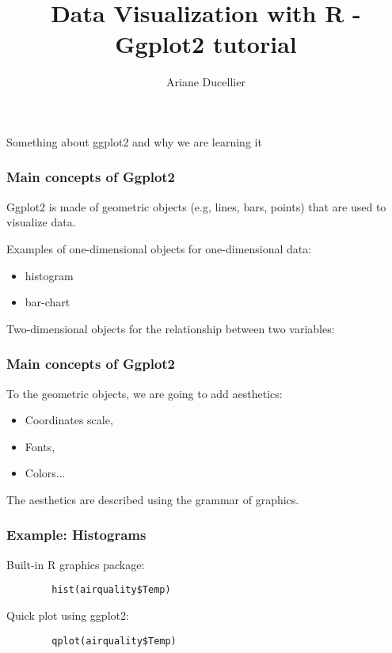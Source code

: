\documentclass{beamer}
\title[Ggplot2 tutorial]{Data Visualization with R - Ggplot2 tutorial}
\author{Ariane Ducellier}
\begin{document}
	\begin{frame}
		\titlepage
	\end{frame}

	\begin{frame}
		Something about ggplot2 and why we are learning it
	\end{frame}

	\begin{frame}
		\frametitle{Main concepts of Ggplot2}

		Ggplot2 is made of geometric objects (e.g, lines, bars, points) that are used to visualize data.

		Examples of one-dimensional objects for one-dimensional data:
		\begin{itemize}
			\item histogram
			\item bar-chart
		\end{itemize}

		Two-dimensional objects for the relationship between two variables:
	\end{frame}

	\begin{frame}
		\frametitle{Main concepts of Ggplot2}
		
		To the geometric objects, we are going to add aesthetics:
		\begin{itemize}
			\item Coordinates scale,
			\item Fonts,
			\item Colors...
		\end{itemize}

		The aesthetics are described using the grammar of graphics.
	\end{frame}

	\begin{frame}[fragile]
		\frametitle{Example: Histograms}

		Built-in R graphics package:

		\begin{exampleblock}{}
		\begin{center}
		\begin{BVerbatim}
		hist(airquality$Temp)
		\end{BVerbatim}
		\end{center}
		\end{exampleblock}{}

		Quick plot using ggplot2:

		\begin{exampleblock}{}
		\begin{center}
		\begin{BVerbatim}
		qplot(airquality$Temp)
		\end{BVerbatim}
		\end{center}
		\end{exampleblock}{}

	\end{frame}
\end{document}

